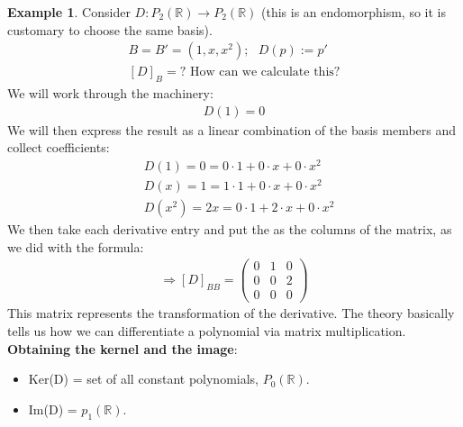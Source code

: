 \documentclass[a4paper, 12pt]{article}
\theoremstyle{definition}
\newtheorem{exmp}{Example}[section]
\theoremstyle{definition}
\theoremstyle{definition}
\theoremstyle{definition}
\begin{document}
{\begin{exmp}
	Consider $D: P_2(\mathbb{R}) \rightarrow P_2 (\mathbb{R})$ (this is an endomorphism, so it is customary to choose the same basis). 
	\begin{align*}
		B = B' = (1,x,x^2); \mbox{ } D(p) := p' \\
		[D]_B = ? \mbox{ How can we calculate this?} 
	\end{align*}
	We will work through the machinery: 
	\begin{align*}
		D(1) = 0
	\end{align*}
	We will then express the result as a linear combination of the basis members and collect coefficients: 
	\begin{align*}
		& D(1) = 0 =  0 \cdot 1 + 0 \cdot x + 0 \cdot x^2 \\
		& D(x) = 1 = 1 \cdot 1 + 0 \cdot x + 0 \cdot x^2 \\
		& D(x^2) = 2x = 0 \cdot 1 + 2 \cdot x + 0 \cdot x^2 
	\end{align*}
	We then take each derivative entry and put the as the columns of the matrix, as we did with the formula: 
	\begin{align*}
		\Rightarrow [D]_{BB} = \begin{pmatrix}
			0 & 1 & 0 \\
			0 & 0 & 2 \\
			0 & 0 & 0 
		\end{pmatrix}
	\end{align*}
	This matrix represents the transformation of the derivative. The theory basically tells us how we can differentiate a polynomial via matrix multiplication. 
	\textbf{Obtaining the kernel and the image}: 
	\begin{itemize}
		\item Ker(D) = set of all constant polynomials, $P_{0}(\mathbb{R})$. 
		\item Im(D) = $p_1(\mathbb{R})$. 
	\end{itemize}
\end{exmp}

}
\end{document}
